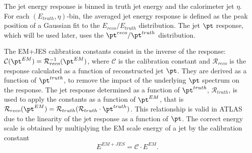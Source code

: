  The jet energy response is binned in truth jet energy and the calorimeter jet $\eta$.  For each $(E_{truth}, \eta)$-bin, the averaged jet energy response is defined as the peak position of a Gaussian fit to the $E_{reco} / E_{truth}$ distribution. The jet $\pt$ response, which will be used later, uses the $\pt^{reco} / \pt^{truth}$ distribution.


The EM+JES calibration constants consist in the inverse of the response: $\mathcal{C}(\pt^{EM})=\mathcal{R}^{-1}_{reco}(\pt^{EM})$, where $\mathcal{C}$ is the calibration constant and $\mathcal{R}_{reco}$ is the response calculated as a function of reconstructed jet $\pt$. They are derived as a function of $\pt^{truth}$, to remove the impact of the underlying $\pt$ spectrum on the response.  The jet response determined as a function of $\pt^{truth}$, $\mathcal{R}_{truth}$, is used to apply the constants as a function of $\pt^{EM}$, that is $\mathcal{R}_{reco}(\pt^{EM})=\mathcal{R}_{truth}(\mathcal{R}_{truth}\cdot \pt^{truth})$. This relationship is valid in ATLAS due to the linearity of the jet response as a function of $\pt$.
The correct energy scale is obtained by multiplying the EM scale energy of a jet by  the calibration constant 
%
\begin{equation}
E^{EM+JES} = \mathcal{C} \cdot E^{EM}.
\end{equation}
%

%
%


